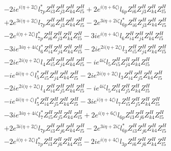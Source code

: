 \begin{align}
 &-2 i e^{i \Big(\eta +2 \zeta \Big)} l_{7p}^* Z_{{i 3}}^{H} Z_{{j 3}}^{H} Z_{{k 4}}^{H} Z_{{l 5}}^{H} +2 e^{i \Big(\eta +6 \zeta \Big)} l_{6p} Z_{{i 6}}^{H} Z_{{j 3}}^{H} Z_{{k 4}}^{H} Z_{{l 5}}^{H} \nonumber \\ 
 &+2 e^{3 i \Big(\eta +2 \zeta \Big)} l_{7p} Z_{{i 6}}^{H} Z_{{j 3}}^{H} Z_{{k 4}}^{H} Z_{{l 5}}^{H} -2 e^{3 i \eta +2 i \zeta } l_{6p}^* Z_{{i 6}}^{H} Z_{{j 3}}^{H} Z_{{k 4}}^{H} Z_{{l 5}}^{H} \nonumber \\ 
 &-2 e^{i \Big(\eta +2 \zeta \Big)} l_{7p}^* Z_{{i 6}}^{H} Z_{{j 3}}^{H} Z_{{k 4}}^{H} Z_{{l 5}}^{H} -3 i e^{i \Big(\eta +4 \zeta \Big)} l_6 Z_{{i 4}}^{H} Z_{{j 4}}^{H} Z_{{k 4}}^{H} Z_{{l 5}}^{H} \nonumber \\ 
 &-3 i e^{3 i \eta +4 i \zeta } l_6^* Z_{{i 4}}^{H} Z_{{j 4}}^{H} Z_{{k 4}}^{H} Z_{{l 5}}^{H} -2 i e^{2 i \Big(\eta +2 \zeta \Big)} l_3 Z_{{i 5}}^{H} Z_{{j 4}}^{H} Z_{{k 4}}^{H} Z_{{l 5}}^{H} \nonumber \\ 
 &-2 i e^{2 i \Big(\eta +2 \zeta \Big)} l_4 Z_{{i 5}}^{H} Z_{{j 4}}^{H} Z_{{k 4}}^{H} Z_{{l 5}}^{H} -i e^{4 i \zeta } l_5 Z_{{i 5}}^{H} Z_{{j 4}}^{H} Z_{{k 4}}^{H} Z_{{l 5}}^{H} \nonumber \\ 
 &-i e^{4 i \Big(\eta +\zeta \Big)} l_5^* Z_{{i 5}}^{H} Z_{{j 4}}^{H} Z_{{k 4}}^{H} Z_{{l 5}}^{H} -2 i e^{2 i \Big(\eta +2 \zeta \Big)} l_3 Z_{{i 4}}^{H} Z_{{j 5}}^{H} Z_{{k 4}}^{H} Z_{{l 5}}^{H} \nonumber \\ 
 &-2 i e^{2 i \Big(\eta +2 \zeta \Big)} l_4 Z_{{i 4}}^{H} Z_{{j 5}}^{H} Z_{{k 4}}^{H} Z_{{l 5}}^{H} -i e^{4 i \zeta } l_5 Z_{{i 4}}^{H} Z_{{j 5}}^{H} Z_{{k 4}}^{H} Z_{{l 5}}^{H} \nonumber \\ 
 &-i e^{4 i \Big(\eta +\zeta \Big)} l_5^* Z_{{i 4}}^{H} Z_{{j 5}}^{H} Z_{{k 4}}^{H} Z_{{l 5}}^{H} -3 i e^{i \Big(\eta +4 \zeta \Big)} l_7 Z_{{i 5}}^{H} Z_{{j 5}}^{H} Z_{{k 4}}^{H} Z_{{l 5}}^{H} \nonumber \\ 
 &-3 i e^{3 i \eta +4 i \zeta } l_7^* Z_{{i 5}}^{H} Z_{{j 5}}^{H} Z_{{k 4}}^{H} Z_{{l 5}}^{H} +2 e^{i \Big(\eta +6 \zeta \Big)} l_{6p} Z_{{i 3}}^{H} Z_{{j 6}}^{H} Z_{{k 4}}^{H} Z_{{l 5}}^{H} \nonumber \\ 
 &+2 e^{3 i \Big(\eta +2 \zeta \Big)} l_{7p} Z_{{i 3}}^{H} Z_{{j 6}}^{H} Z_{{k 4}}^{H} Z_{{l 5}}^{H} -2 e^{3 i \eta +2 i \zeta } l_{6p}^* Z_{{i 3}}^{H} Z_{{j 6}}^{H} Z_{{k 4}}^{H} Z_{{l 5}}^{H} \nonumber \\ 
 &-2 e^{i \Big(\eta +2 \zeta \Big)} l_{7p}^* Z_{{i 3}}^{H} Z_{{j 6}}^{H} Z_{{k 4}}^{H} Z_{{l 5}}^{H} -2 i e^{i \Big(\eta +4 \zeta \Big)} l_{3p} Z_{{i 6}}^{H} Z_{{j 6}}^{H} Z_{{k 4}}^{H} Z_{{l 5}}^{H} \nonumber \\ 

\end{align}

